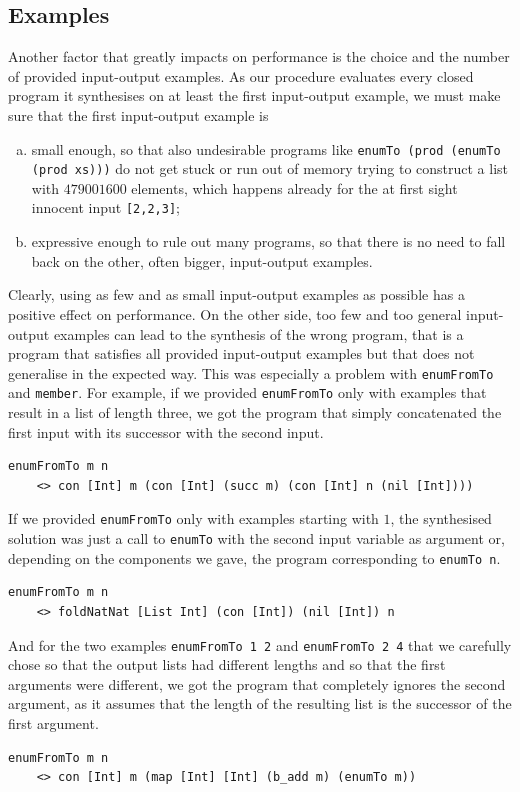 \subsection{Examples}
Another factor that greatly impacts on performance is the choice and the number of provided input-output examples. As our procedure evaluates every closed program it synthesises on at least the first input-output example, we must make sure that the first input-output example is
\begin{enumerate}[a.]
\item small enough, so that also undesirable programs like \lstinline?enumTo (prod (enumTo (prod xs)))? do not get stuck or run out of memory trying to construct a list with $479001600$ elements, which happens already for the at first sight innocent input \lstinline?[2,2,3]?;
\item expressive enough to rule out many programs, so that there is no need to fall back on the other, often bigger, input-output examples.
\end{enumerate}
Clearly, using as few and as small input-output examples as possible has a positive effect on performance. On the other side, too few and too general input-output examples can lead to the synthesis of the wrong program, that is a program that satisfies all provided input-output examples but that does not generalise in the expected way. This was especially a problem with \lstinline?enumFromTo? and \lstinline?member?. For example, if we provided \lstinline?enumFromTo? only with examples that result in a list of length three, we got the program that simply concatenated the first input with its successor with the second input.
\begin{lstlisting}[style=plain]
enumFromTo m n
    <> con [Int] m (con [Int] (succ m) (con [Int] n (nil [Int])))
\end{lstlisting}
If we provided \lstinline?enumFromTo? only with examples starting with $1$, the synthesised solution was just a call to \lstinline?enumTo? with the second input variable as argument or, depending on the components we gave, the program corresponding to \lstinline?enumTo n?.
\begin{lstlisting}[style=plain]
enumFromTo m n
    <> foldNatNat [List Int] (con [Int]) (nil [Int]) n
\end{lstlisting}
And for the two examples \lstinline?enumFromTo 1 2? and \lstinline?enumFromTo 2 4? that we carefully chose so that the output lists had different lengths and so that the first arguments were different, we got the program that completely ignores the second argument, as it assumes that the length of the resulting list is the successor of the first argument.
\begin{lstlisting}[style=plain]
enumFromTo m n
    <> con [Int] m (map [Int] [Int] (b_add m) (enumTo m))
\end{lstlisting}

